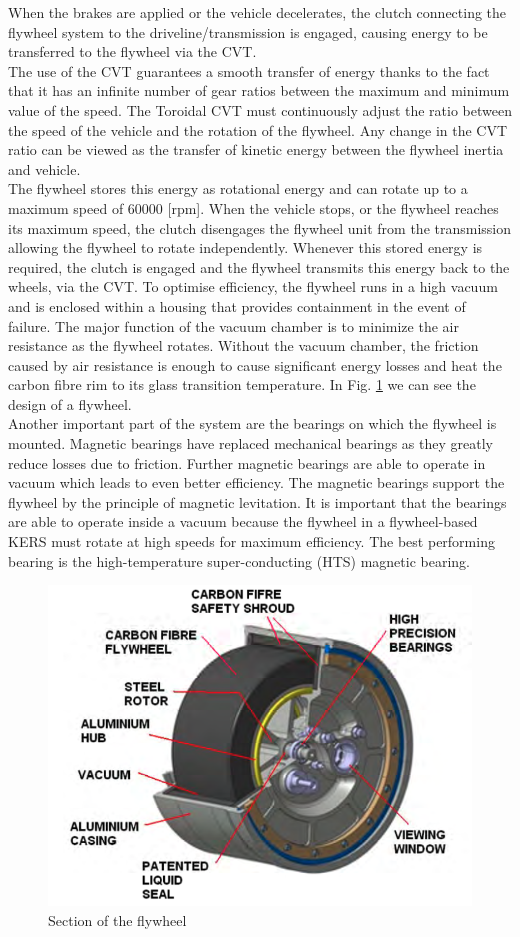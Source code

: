 \documentclass[11pt]{article}
\begin{document}
When the brakes are applied or the vehicle decelerates, the clutch connecting the flywheel system to the driveline/transmission is engaged, causing energy to be transferred to the flywheel via the CVT. \\
The use of the CVT guarantees a smooth transfer of energy thanks to the fact that it has an infinite number of gear ratios between the maximum and minimum value of the speed. The Toroidal CVT must continuously adjust the ratio between the speed of the vehicle and the rotation of the flywheel. Any change in the CVT ratio can be viewed as the transfer of kinetic energy between the flywheel inertia and vehicle.\\
The flywheel stores this energy as rotational energy and can rotate up to a maximum speed of $60000$ [rpm]. When the vehicle stops, or the flywheel reaches its maximum speed, the clutch disengages the flywheel unit from the transmission allowing the flywheel to rotate independently. Whenever this stored energy is required, the clutch is engaged and the flywheel transmits this energy back to the wheels, via the CVT. To optimise efficiency, the flywheel runs in a high vacuum and is enclosed within a housing that provides containment in the event of failure.
The major function of the vacuum chamber is to minimize the air resistance as the flywheel rotates. Without the vacuum chamber, the friction caused by air resistance is enough to cause significant energy losses and heat the carbon fibre rim to its glass transition temperature. In Fig. \ref{fig: Flywheel} we can see the design of a flywheel.\\
Another important part of the system are the bearings on which the flywheel is mounted. Magnetic bearings have replaced mechanical bearings as they greatly reduce losses due to friction. Further magnetic bearings are able to operate in vacuum which leads to even better efficiency. The magnetic bearings support the flywheel by the principle of magnetic levitation. It is important that the bearings are able to operate inside a vacuum because the flywheel in a flywheel-based KERS must rotate at high speeds for maximum efficiency. The best performing bearing is the high-temperature super-conducting (HTS) magnetic bearing.

\begin{figure}[H]
\centering
\includegraphics[width=.6\textwidth]{Images/State_of_the_art/Flywheel_Components.png}
\caption{Section of the flywheel}
\label{fig: Flywheel}
\end{figure}
\end{document}
